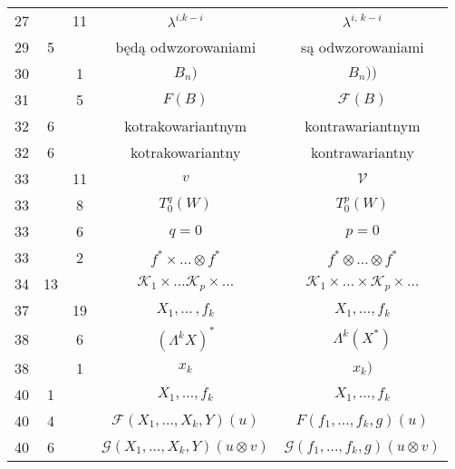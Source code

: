\documentclass[a4paper,11pt]{article}
\newcommand{\mc}{\mathcal}
\newcommand{\ld}{\ldots}
\newcommand{\ti}{\times}
\newcommand{\ot}{\otimes}
\newcommand{\la}{\lambda}
\newcommand{\La}{\Lambda}
\newcommand{\F}{\mc{F}}
\newcommand{\G}{\mc{G}}
\newcommand{\K}{\mc{K}}
\newcommand{\V}{\mc{V}}
\begin{document}
\begin{center}
\begin{tabular}{|c|c|c|c|c|}
    27 & & 11 & $\la^{ i. k - i }$ & $\la^{ i,\, k - i }$ \\
    29 &  5 & & będą odwzorowaniami & są odwzorowaniami \\
    30 & &  1 & $B_{ n } )$ & $B_{ n } ) )$ \\
    31 & &  5 & $F( B )$ & $\F( B )$ \\
    32 &  6 & & kotrakowariantnym & kontrawariantnym \\
    32 &  6 & & kotrakowariantny & kontrawariantny \\
    33 & & 11 & $v$ & $\V$ \\
    33 & &  8 & $T_{ 0 }^{ q }( W )$ & $T_{ 0 }^{ p }( W )$ \\
    33 & &  6 & $q = 0$ & $p = 0$ \\
    33 & &  2 & $f^{ * } \ti \ld \ot f^{ * }$
           & $f^{ * } \ot \ld \ot f^{ * }$ \\
    34 & 13 & & $\K_{ 1 } \ti \ld \K_{ p } \ti \ld$
           & $\K_{ 1 } \ti \ld \ti \K_{ p } \ti \ld$ \\
    37 & & 19 & $X_{ 1 }, \ld\, , f_{ k }$ & $X_{ 1 }, \ld , f_{ k }$ \\
    38 & &  6 & $( \La^{ k } X )^{ * }$ & $\La^{ k }( X^{ * } )$ \\
    38 & &  1 & $x_{ k }$ & $x_{ k } )$ \\
    40 & 1 & & $X_{ 1 }, \! \ld , f_{ k }$ & $X_{ 1 }, \ld , f_{ k }$ \\
    40 & 4 & & $\F( X_{ 1 }, \ld, X_{ k }, Y )( u )$
           & $F( f_{ 1 }, \ld, f_{ k }, g )( u )$ \\
    40 & 6 & & $\G( X_{ 1 }, \ld, X_{ k }, Y )( u \ot v )$
           & $\G( f_{ 1 }, \ld, f_{ k }, g )( u \ot v )$ \\
    \hline
  \end{tabular}


\end{center}
\end{document}
